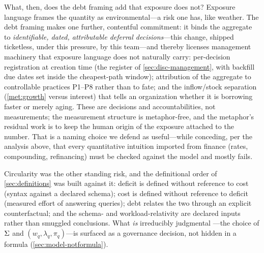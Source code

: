 What, then, does the debt framing add that exposure does not? Exposure language
frames the quantity as environmental---a risk one has, like weather. The debt
framing makes one further, contentful commitment: it binds the aggregate to
\emph{identifiable, dated, attributable deferral decisions}---this change, shipped
ticketless, under this pressure, by this team---and thereby licenses management
machinery that exposure language does not naturally carry: per-decision
registration at creation time (the register of \cref{sec:disc-management}, with
backfill due dates set inside the cheapest-path window); attribution of the
aggregate to controllable practices P1--P8 rather than to fate; and the
inflow/stock separation (\cref{met:growth} versus interest) that tells an
organization whether it is borrowing faster or merely aging. These are decisions
and accountabilities, not measurements; the measurement structure is
metaphor-free, and the metaphor's residual work is to keep the human origin of
the exposure attached to the number. That is a naming choice we defend as
useful---while conceding, per the analysis above, that every quantitative
intuition imported from finance (rates, compounding, refinancing) must be checked
against the model and mostly fails.

Circularity was the other standing risk, and the definitional order of
\cref{sec:definitions} was built against it: deficit is defined without reference
to cost (syntax against a declared schema); cost is defined without reference to
deficit (measured effort of answering queries); debt relates the two through an
explicit counterfactual; and the schema- and workload-relativity are declared
inputs rather than smuggled conclusions. What \emph{is} irreducibly judgmental
---the choice of $\Sigma$ and $(w_q, \lambda_q, \pi_q)$---is surfaced as a governance decision,
not hidden in a formula (\cref{sec:model-notformula}).

